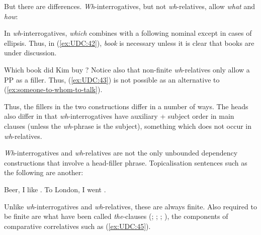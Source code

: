 \documentclass[output=paper,biblatex,babelshorthands,newtxmath,draftmode,colorlinks,citecolor=brown]{langscibook}
\begin{document}
\eal
\label{ex:UDC:38}

\zl

\eal
\label{ex:UDC:39}
\zl

\noindent
But there are differences. \emph{Wh}-interrogatives, but not
\emph{wh}-relatives, allow \emph{what} and \emph{how}:

\eal
\label{ex:UDC:40}
\zl

\eal
\label{ex:UDC:41}
\zl

\noindent
In \emph{wh}-interrogatives, \emph{which} combines with a following
nominal except in cases of ellipsis. Thus, in (\ref{ex:UDC:42}), \emph{book} is
necessary unless it is clear that books are under discussion.

\ea
\label{ex:UDC:42}
Which book did Kim buy \trace{}?
\z
\noindent
Notice also that non-finite \emph{wh}-relatives only allow a PP as a
filler. Thus, (\ref{ex:UDC:43}) is not possible as an alternative to (\ref{ex:someone-to-whom-to-talk}).

\begin{exe}
     \label{ex:UDC:43}
\end{exe}

\noindent
Thus, the fillers in the two constructions differ in a number of ways.
The heads also differ in that \emph{wh}-interrogatives have auxiliary +
subject order in main clauses (unless the \emph{wh}-phrase is the
subject), something which does not occur in \emph{wh}-relatives.

\emph{Wh}-interrogatives and \emph{wh}-relatives are not the only
unbounded dependency constructions that involve a head-filler phrase.
Topicalisation sentences such as the following are another:

\begin{exe} \ex \begin{xlist} \label{ex:UDC:44}
\ex Beer, I like \trace{}.
\ex To London, I went \trace{}.
\end{xlist}
\end{exe}

\noindent
Unlike\label{udc:page-correlatives-start} \emph{wh}-interrogatives and \emph{wh}-relatives, these are
always finite. Also required to be finite are what have been called
\emph{the}-clauses (\citealp{Borsley:04}; \citealp[490--494, 524--527]{Sag:10a};
\citealp{Borsley:11}; {}), the components of
comparative correlatives such as (\ref{ex:UDC:45}).
\end{document}
